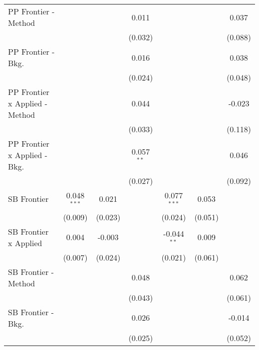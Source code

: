 \begin{tabular}{lcccccc}
   PP Frontier - Method           &               &               & 0.011        &               &              & 0.037\\   
                                  &               &               & (0.032)      &               &              & (0.088)\\   
   PP Frontier - Bkg.             &               &               & 0.016        &               &              & 0.038\\   
                                  &               &               & (0.024)      &               &              & (0.048)\\   
   PP Frontier x Applied - Method &               &               & 0.044        &               &              & -0.023\\   
                                  &               &               & (0.033)      &               &              & (0.118)\\   
   PP Frontier x Applied - Bkg.   &               &               & 0.057$^{**}$ &               &              & 0.046\\   
                                  &               &               & (0.027)      &               &              & (0.092)\\   
   SB Frontier                    & 0.048$^{***}$ & 0.021         &              & 0.077$^{***}$ & 0.053        &   \\   
                                  & (0.009)       & (0.023)       &              & (0.024)       & (0.051)      &   \\   
   SB Frontier x Applied          & 0.004         & -0.003        &              & -0.044$^{**}$ & 0.009        &   \\   
                                  & (0.007)       & (0.024)       &              & (0.021)       & (0.061)      &   \\   
   SB Frontier - Method           &               &               & 0.048        &               &              & 0.062\\   
                                  &               &               & (0.043)      &               &              & (0.061)\\   
   SB Frontier - Bkg.             &               &               & 0.026        &               &              & -0.014\\   
                                  &               &               & (0.025)      &               &              & (0.052)\\   

\end{tabular}

